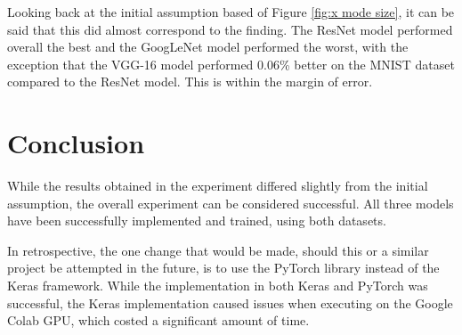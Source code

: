 \documentclass[conference]{IEEEtran}
\begin{document}
Looking back at the initial assumption based of Figure \ref{fig:x mode size}, it can be said that this did almost correspond to the finding.
The ResNet model performed overall the best and the GoogLeNet model performed the worst, with the exception that the VGG-16 model performed 0.06\% better on the MNIST dataset compared to the ResNet model. 
This is within the margin of error.
\section{Conclusion}\label{C6}
While the results obtained in the experiment differed slightly from the initial assumption, the overall experiment can be considered successful.
All three models have been successfully implemented and trained, using both datasets.

In retrospective, the one change that would be made, should this or a similar project be attempted in the future, is to use the PyTorch library instead of the Keras framework.
While the implementation in both Keras and PyTorch was successful, the Keras implementation caused issues when executing on the Google Colab GPU, which costed a significant amount of time.

\printbibliography
\end{document}
